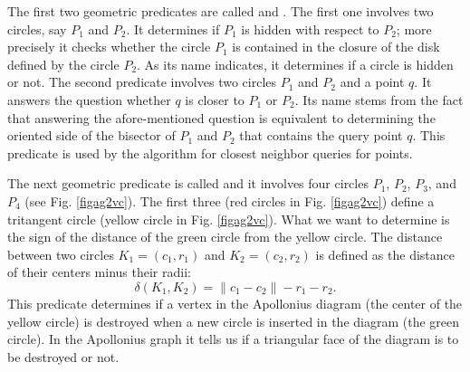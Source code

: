 {The first two geometric predicates are called
 and . The first one
involves two circles, say $P_1$ and $P_2$. It determines if $P_1$ is
hidden with respect to $P_2$; more precisely it checks whether the
circle $P_1$ is contained in the closure of the disk defined by the
circle $P_2$. As its name indicates, it determines if a circle is
hidden or not. The second predicate involves two circles $P_1$ and
$P_2$ and a point $q$. It answers the question whether $q$ is closer
to $P_1$ or $P_2$. Its name stems from the fact that answering the
afore-mentioned question is equivalent to determining the oriented
side of the bisector of $P_1$ and $P_2$ that contains the query point
$q$. This predicate is used by the algorithm for closest neighbor
queries for points.


The next geometric predicate is called  and it
involves four circles $P_1$, $P_2$, $P_3$, and $P_4$ (see
Fig. \ref{figag2vc}). The first three (red circles in
Fig. \ref{figag2vc}) define a tritangent circle (yellow
circle in Fig. \ref{figag2vc}). What we want to determine is
the sign of the distance of the green circle from the yellow
circle. The distance between two circles $K_1=(c_1,r_1)$ and
$K_2=(c_2, r_2)$ is defined as the distance of their centers minus
their radii:
\[   \delta(K_1, K_2) = \|c_1-c_2\|-r_1-r_2. \]
This predicate determines if a vertex in the Apollonius diagram
(the center of the yellow circle) is destroyed when a new circle is
inserted in the diagram (the green circle). In the Apollonius graph
it tells us if a triangular face of the diagram is to be destroyed or
not.

}
